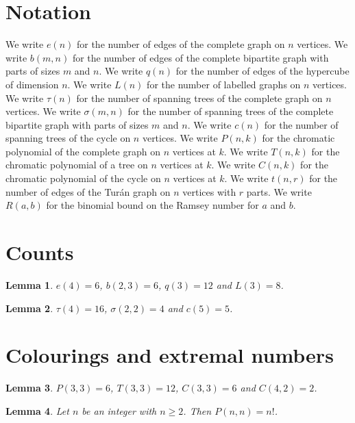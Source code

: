\documentclass{article}
\newtheorem{lemma}{Lemma}
\begin{document}
\section{Notation}

We write $e(n)$ for the number of edges of the complete graph on $n$ vertices.
We write $b(m,n)$ for the number of edges of the complete bipartite graph with parts of sizes $m$ and $n$.
We write $q(n)$ for the number of edges of the hypercube of dimension $n$.
We write $L(n)$ for the number of labelled graphs on $n$ vertices.
We write $\tau(n)$ for the number of spanning trees of the complete graph on $n$ vertices.
We write $\sigma(m,n)$ for the number of spanning trees of the complete bipartite graph with parts of sizes $m$ and $n$.
We write $c(n)$ for the number of spanning trees of the cycle on $n$ vertices.
We write $P(n,k)$ for the chromatic polynomial of the complete graph on $n$ vertices at $k$.
We write $T(n,k)$ for the chromatic polynomial of a tree on $n$ vertices at $k$.
We write $C(n,k)$ for the chromatic polynomial of the cycle on $n$ vertices at $k$.
We write $t(n,r)$ for the number of edges of the Tur\'an graph on $n$ vertices with $r$ parts.
We write $R(a,b)$ for the binomial bound on the Ramsey number for $a$ and $b$.

\section{Counts}

\begin{lemma}\label{edges}
$e(4)=6$, $b(2,3)=6$, $q(3)=12$ and $L(3)=8$.
\end{lemma}

\begin{lemma}\label{trees}
$\tau(4)=16$, $\sigma(2,2)=4$ and $c(5)=5$.
\end{lemma}

\section{Colourings and extremal numbers}

\begin{lemma}\label{chromatic}
$P(3,3)=6$, $T(3,3)=12$, $C(3,3)=6$ and $C(4,2)=2$.
\end{lemma}

\begin{lemma}\label{factorial}
Let $n$ be an integer with $n\ge2$. Then $P(n,n)=n!$.
\end{lemma}
\end{document}
